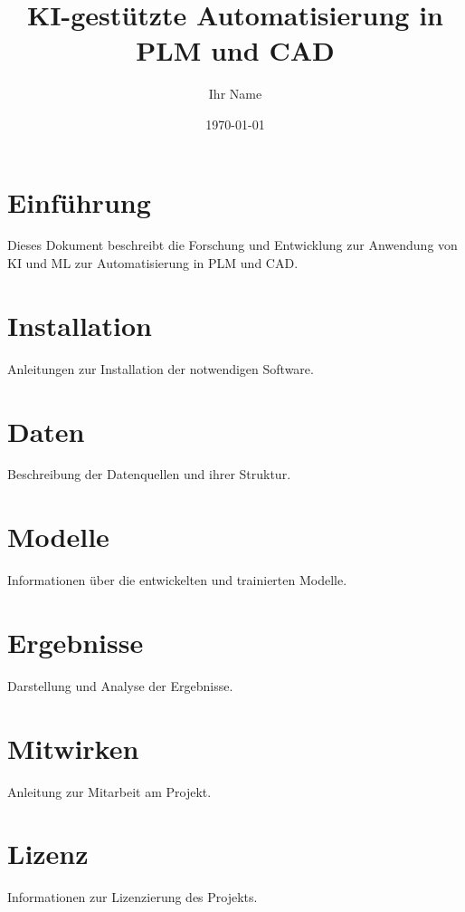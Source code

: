 \documentclass[a4paper,12pt]{article}
\title{KI-gestützte Automatisierung in PLM und CAD}
\author{Ihr Name}
\date{\today}
\begin{document}
\maketitle

\tableofcontents

\section{Einführung}
Dieses Dokument beschreibt die Forschung und Entwicklung zur Anwendung von KI und ML zur Automatisierung in PLM und CAD.

\section{Installation}
Anleitungen zur Installation der notwendigen Software.

\section{Daten}
Beschreibung der Datenquellen und ihrer Struktur.

\section{Modelle}
Informationen über die entwickelten und trainierten Modelle.

\section{Ergebnisse}
Darstellung und Analyse der Ergebnisse.

\section{Mitwirken}
Anleitung zur Mitarbeit am Projekt.

\section{Lizenz}
Informationen zur Lizenzierung des Projekts.
\end{document}
